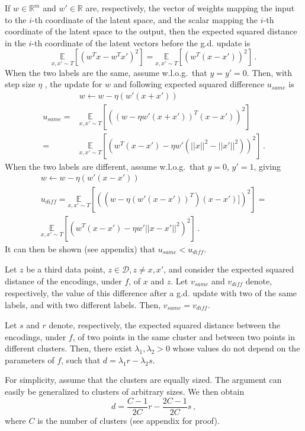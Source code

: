 \documentclass[runningheads]{llncs}
\begin{document}
If $w \in \mathbb{R}^{m}$ and $w' \in \mathbb{R}$ are, respectively, the vector of weights mapping the input to the $i$-th coordinate of the latent space, and the scalar mapping the $i$-th coordinate of the latent space to the output, then the expected squared distance in the $i$-th coordinate of the latent vectors before the g.d. update is 
\[
\underset{x, x' \sim T}{\mathbb{E}}[(w^Tx - w^Tx')^2] = \underset{x, x' \sim T}{\mathbb{E}}[(w^T(x - x'))^2] \,.
\]
When the two labels are the same, assume w.l.o.g.~that $y = y' = 0$. Then, with step size $\eta$ , the update for $w$ and following expected squared difference $u_{same}$ is 
\begin{align*} 
&w \gets w - \eta (w'(x+x')) \\
u_{\mathit{same}} =& \underset{x, x' \sim T}{\mathbb{E}}[((w - \eta w'(x+x'))^T(x - x'))^2] \\
=& \underset{x, x' \sim T}{\mathbb{E}}[(w^T(x - x') - \eta w'(||x||^2-||x'||^2))^2]  \,.
\end{align*}
When the two labels are different, assume w.l.o.g.~that $y = 0$, $y' = 1$, giving
\begin{gather*} 
w \gets w - \eta (w'(x-x')) \\
u_{\mathit{diff}} = \underset{x, x' \sim T}{\mathbb{E}}[((w - \eta (w'(x-x'))^T)(x - x')])^2] = \\
\underset{x, x' \sim T}{\mathbb{E}}[(w^T(x - x') - \eta w'||x-x'||^2)^2]  \,.
\end{gather*} 
It can then be shown (see appendix) that $u_{\mathit{same}} < u_{\mathit{diff}}$. 

 
\begin{lemma} \label{lemma:equal-distance-from-3rd}
    Let $z$ be a third data point, $z \in \mathcal{D}, z \neq x, x'$, and consider the expected squared distance of the encodings, under $f$, of $x$ and $z$. Let $v_{\mathit{same}}$ and $v_{\mathit{diff}}$ denote, respectively, the value of this difference after a g.d. update with two of the same labels, and with two different labels. Then, $v_{\mathit{same}} = v_{\mathit{diff}}$.
\end{lemma}

\begin{lemma} \label{lemma:same-diff-decomp}
    Let $s$ and $r$ denote, respectively, the expected squared distance between the encodings, under $f$, of two points in the same cluster and between two points in different clusters. Then, there exist $\lambda_1, \lambda_2 > 0$ whose values do not depend on the parameters of $f$, such that $d = \lambda_1r - \lambda_2s$.
\end{lemma}
For simplicity, assume that the clusters are equally sized. The argument can easily be generalized to clusters of arbitrary sizes. We then obtain 
\[
d = \frac{C-1}{2C}r - \frac{2C -1}{2C}s\,,
\]
where $C$ is the number of clusters (see appendix for proof).
\end{document}
